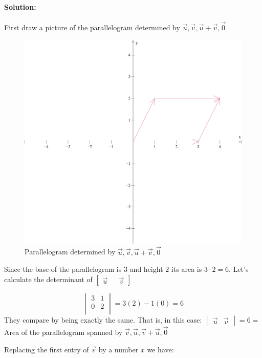 \documentclass[12pt, letterpaper]{article}
\theoremstyle{statement}
\theoremstyle{statement}
\newenvironment{Solution}{\noindent\ignorespaces\paragraph{Solution:}}{\hfill \ding{122}\par\noindent}
\begin{document}
    \begin{Solution}
    First draw a picture of the parallelogram determined by $\Vec{u}, \Vec{v}, \Vec{u}+\Vec{v}, \Vec{0}$
    
    \begin{figure}[H]
        \centering
        \includegraphics[scale=0.5]{vectors}
        \caption{Parallelogram determined by $\Vec{u}, \Vec{v}, \Vec{u}+\Vec{v}, \Vec{0}$}
        \label{vectors1}
    \end{figure}
    Since the base of the parallelogram is $3$ and height $2$ its area is $3\cdot2=6$. Let's calculate the determinant of $\begin{bmatrix} \Vec{u} && \Vec{v}\end{bmatrix}$
    
    $$
    \begin{vmatrix}
    3 & 1 \\
    0 & 2 \\
    \end{vmatrix}
    = 3(2) - 1(0) = 6
    $$
    They compare by being exactly the same. That is, in this case: $\begin{vmatrix} \Vec{u} & \Vec{v} \end{vmatrix}=6=$ Area of the parallelogram spanned by $\Vec{v}, \Vec{u}, \Vec{v}+\Vec{u}, \Vec{0}$
    
    Replacing the first entry of $\Vec{v}$ by a number $x$ we have: 
    

\end{Solution}
\end{document}
